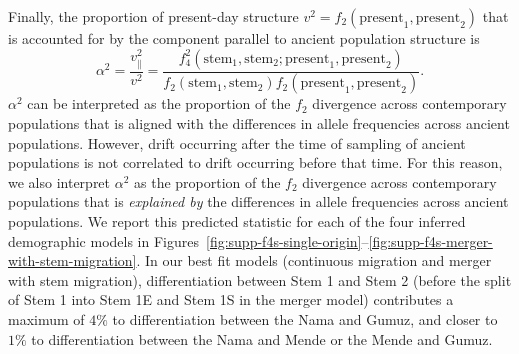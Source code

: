 \documentclass[]{article}
\begin{document}
Finally, the proportion of present-day structure
$v^2 = f_2(\text{present}_1, \text{present}_2)$ that is accounted for by the
component parallel to ancient population structure is
\begin{equation}
    \alpha^2 = \frac{v_\parallel^2}{v^2} =
    \frac{f_4^2(\text{stem}_1, \text{stem}_2; \text{present}_1, \text{present}_2)}
    {f_2(\text{stem}_1,\text{stem}_2)f_2(\text{present}_1, \text{present}_2)}.
\end{equation}
$\alpha^2$ can be interpreted as the proportion of the $f_2$
divergence across contemporary populations that is aligned with the differences in
allele frequencies across ancient populations. However, drift occurring after
the time of sampling of ancient populations is not correlated to drift
occurring before that time. For this reason, we also interpret $\alpha^2$ as the
proportion of the $f_2$ divergence across contemporary populations that is
\emph{explained by} the differences in allele frequencies across ancient populations.
We report this predicted statistic for each of the four inferred demographic models in
Figures~\ref{fig:supp-f4s-single-origin}--\ref{fig:supp-f4s-merger-with-stem-migration}.
In our best fit models (continuous migration and merger with stem migration),
differentiation between Stem 1 and Stem 2
(before the split of Stem 1 into Stem 1E and Stem 1S in the merger model)
contributes a maximum of $4\%$ to differentiation between the Nama and Gumuz, and closer
to $1\%$ to differentiation between the Nama and Mende or the Mende and Gumuz.
\end{document}
